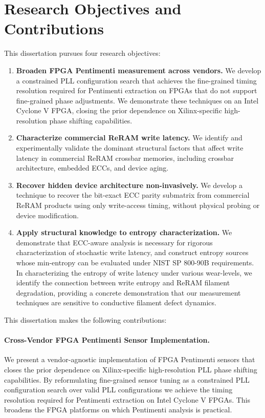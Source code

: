 \section{Research Objectives and Contributions}
\label{sec:objectives}

This dissertation pursues four research objectives:

\begin{enumerate}
	\item \textbf{Broaden FPGA Pentimenti measurement across vendors.} We develop
	      a constrained PLL configuration search that achieves the fine-grained
	      timing resolution required for Pentimenti extraction on FPGAs that do
	      not support fine-grained phase adjustments. We demonstrate these
	      techniques on an Intel Cyclone V FPGA, closing the prior dependence on
	      Xilinx-specific high-resolution phase shifting capabilities.
	\item \textbf{Characterize commercial ReRAM write latency.} We identify and
	      experimentally validate the dominant structural factors that affect
	      write latency in commercial ReRAM crossbar memories, including crossbar
	      architecture, embedded ECCs, and device aging.
	\item \textbf{Recover hidden device architecture non-invasively.} We develop a
	      technique to recover the bit-exact ECC parity submatrix from commercial
	      ReRAM products using only write-access timing, without physical probing
	      or device modification.
	\item \textbf{Apply structural knowledge to entropy characterization.} We
	      demonstrate that ECC-aware analysis is necessary for rigorous
	      characterization of stochastic write latency, and construct entropy
	      sources whose min-entropy can be evaluated under NIST SP 800-90B
	      requirements. In characterizing the entropy of write latency under
	      various wear-levels, we identify the connection between write entropy
	      and ReRAM filament degradation, providing a concrete demonstration that
	      our measurement techniques are sensitive to conductive filament defect
	      dynamics.
\end{enumerate}

This dissertation makes the following contributions:

\paragraph{Cross-Vendor FPGA Pentimenti Sensor Implementation.}
We present a vendor-agnostic implementation of FPGA Pentimenti sensors
that closes the prior dependence on Xilinx-specific high-resolution PLL
phase shifting capabilities. By reformulating fine-grained sensor tuning
as a constrained PLL configuration search over valid PLL configurations
we achieve the timing resolution required for Pentimenti extraction on
Intel Cyclone V FPGAs. This broadens the FPGA platforms on which
Pentimenti analysis is practical.

